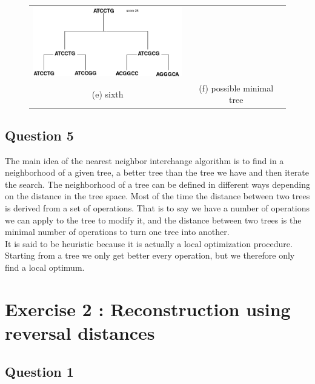 \documentclass[]{article}
\theoremstyle{definition}
\begin{document}
\begin{figure}[h!]
\begin{tabular}{cc}
		\includegraphics*[width = 65mm]{image/final.png}\\
		(e) sixth & (f) possible minimal tree \\[6pt]
	\end{tabular}
\end{figure}

\subsection{Question 5}
The main idea of the nearest neighbor interchange algorithm is to find in a neighborhood of a given tree, a better tree than the tree we have and then iterate the search. The neighborhood of a tree can be defined in different ways depending on the distance in the tree space. Most of the time the distance between two trees is derived from a set of operations. That is to say we have a number of operations we can apply to the tree to modify it, and the distance between two trees is the minimal number of operations to turn one tree into another.\\
It is said to be heuristic because it is actually a local optimization procedure. Starting from a tree we only get better every operation, but we therefore only find a local optimum. 
\section{Exercise 2 : Reconstruction using reversal distances}
\subsection{Question 1}
\end{document}
